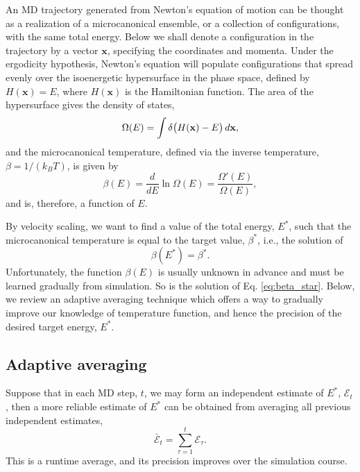 \documentclass[reprint]{revtex4-1}
\begin{document}
An MD trajectory generated from
Newton's equation of motion
can be thought as a realization
of a microcanonical ensemble,
or a collection of configurations,
with the same total energy.
%
Below we shall denote a configuration in the trajectory
by a vector $\mathbf x$,
specifying the coordinates and momenta.
%
Under the ergodicity hypothesis,
Newton's equation will populate configurations
that spread evenly over
the isoenergetic hypersurface in the phase space,
defined by
$H(\mathbf x) = E$,
where $H(\mathbf x)$ is the Hamiltonian function.
%
The area of the hypersurface gives the density of states,
%
\begin{equation}
  \Omega(E)
  =
  \int
    \delta\bigl( H(\mathbf x) - E \bigr)
    \, d\mathbf x
  ,
  \notag
\end{equation}
%
and the microcanonical temperature,
defined via the inverse temperature,
$\beta = 1/(k_B T)$,
is given by
%
\begin{equation}
  \beta(E)
  =
  \frac{ d }{ dE }
  \ln \Omega(E)
  =
  \frac{ \Omega'(E) }
       { \Omega(E)  }
  ,
  \label{eq:betaE_def}
\end{equation}
%
and is, therefore, a function of $E$.
%

By velocity scaling, we want to
find a value of the total energy, $E^*$,
such that the microcanonical temperature
is equal to the target value, $\beta^*$,
i.e., the solution of
%
\begin{equation}
  \beta(E^*)
  =
  \beta^*
  .
  \label{eq:beta_star}
\end{equation}
%
Unfortunately, the function $\beta(E)$
is usually unknown in advance
and must be learned gradually from simulation.
%
So is the solution of Eq. \eqref{eq:beta_star}.
%
Below, we review an adaptive averaging technique
which offers a way
to gradually improve our knowledge of temperature function,
and hence the precision of the desired target energy, $E^*$.



\subsection{Adaptive averaging}



Suppose that in each MD step, $t$,
we may form an independent estimate of $E^*$,
$\mathcal E_t$,
then a more reliable estimate of $E^*$
can be obtained from averaging
all previous independent estimates,
%
\begin{equation}
  \bar{\mathcal E}_t
  =
  \sum_{\tau = 1}^t
    \mathcal E_\tau
  .
  \label{eq:Epsave}
\end{equation}
%
This is a runtime average,
and its precision improves over the simulation course.
\end{document}
